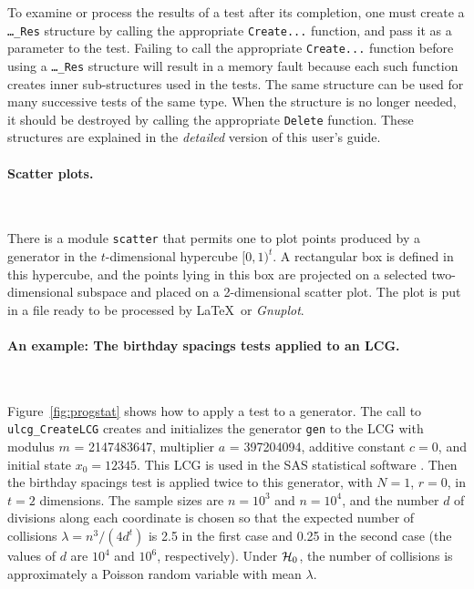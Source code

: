 \ifdetailed %

To examine or process the results of a test after its completion,
one must create a 
{\tt \ldots\_Res} structure by calling the appropriate {\tt Create...} 
function, and pass it as a parameter to the test. Failing to call the
appropriate {\tt Create...} function before using a {\tt \ldots\_Res} 
structure will result in a memory fault because each such 
function creates inner sub-structures used in the tests.
The same structure can be used for many successive tests of the same type.
When the structure is no longer needed, it should be destroyed by
calling the appropriate {\tt Delete} function.
These structures are explained in the {\em detailed\/} 
version of this user's guide.

\fi  %

\paragraph*{Scatter plots.} \
 
There is a  module {\tt scatter} that permits one to plot points produced
by a  generator in the $t$-dimensional hypercube $[0,1)^t$.
A rectangular box is defined in this hypercube, and the points lying 
in this box are projected on a selected two-dimensional subspace
and placed on a 2-dimensional scatter plot.
The plot is put in a file ready to be processed by
\LaTeX\ or {\it Gnuplot}.



\paragraph*{An example: The birthday spacings tests applied to an LCG.} \

Figure~\ref{fig:progstat} shows how to apply a test to a generator.
The call to {\tt ulcg\_CreateLCG} creates and initializes the generator
{\tt gen} to the LCG with modulus $m$ = 2147483647, 
multiplier $a$ = 397204094, additive constant $c=0$, and initial
state $x_0 = 12345$.  This LCG is used in the SAS statistical
 software \cite{iSAS90a}.
Then the birthday spacings test is applied twice to this generator,
with $N=1$, $r=0$, in $t=2$ dimensions.
The sample sizes are $n=10^3$ and $n=10^4$, and the number $d$ of 
divisions along each coordinate is chosen so that the expected number
of collisions $\lambda = n^3/(4d^t)$ is 2.5 in the first case and 0.25
in the second case (the values of $d$ are $10^4$ and $10^6$, respectively).
Under $\mathcal{H}_0$, the number of collisions is approximately a Poisson 
random variable with mean $\lambda$.


